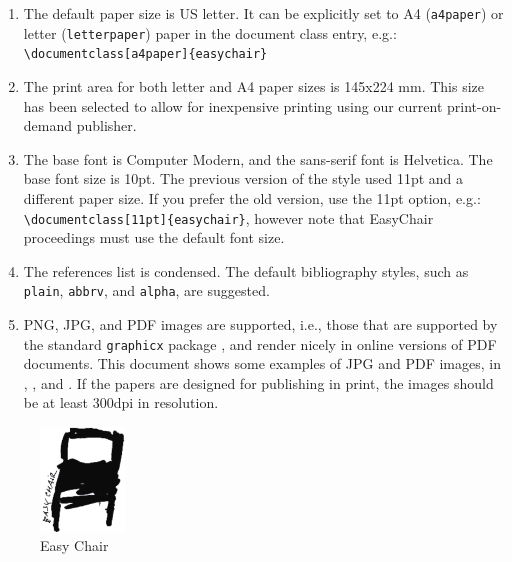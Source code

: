 \documentclass{easychair}
\begin{document}
\begin{enumerate}
\item
The default paper size is US letter. It can be explicitly set to A4 
(\texttt{a4paper}) or letter (\texttt{letterpaper}) paper in the
document class entry, e.g.:\\\verb+\documentclass[a4paper]{easychair}+

\item
The print area for both letter and A4 paper sizes is 145x224 mm. This size
has been selected to allow for inexpensive printing using our current
print-on-demand publisher.

\item
The base font is
Computer Modern,
and the {\sf sans-serif} font is
{\sf Helvetica}. The base font size is 10pt. The previous version of
the style used 11pt and a different paper size. If you prefer the old
version, use the 11pt option,
e.g.: \verb+\documentclass[11pt]{easychair}+, however note that
EasyChair proceedings must use the default font size.

\item
The references list is condensed. The default bibliography styles, such as
\texttt{plain}, \texttt{abbrv}, and \texttt{alpha}, are suggested.

\item
PNG, JPG, and PDF images are supported, i.e., those that are supported by 
the standard \texttt{graphicx} package \cite{graphicx-package}, and render 
nicely in online versions of PDF documents.
This document shows some examples of JPG and PDF images, in 
, , and
. If the papers are designed for publishing
in print, the images should be at least 300dpi in resolution.

\end{enumerate}

\begin{figure}[htp]
	\begin{centering}
	\includegraphics[width=0.2\textwidth]{chairEC}
	\caption{Easy Chair}
	\label{fig:easychair}
	\end{centering}
\end{figure}
\end{document}
